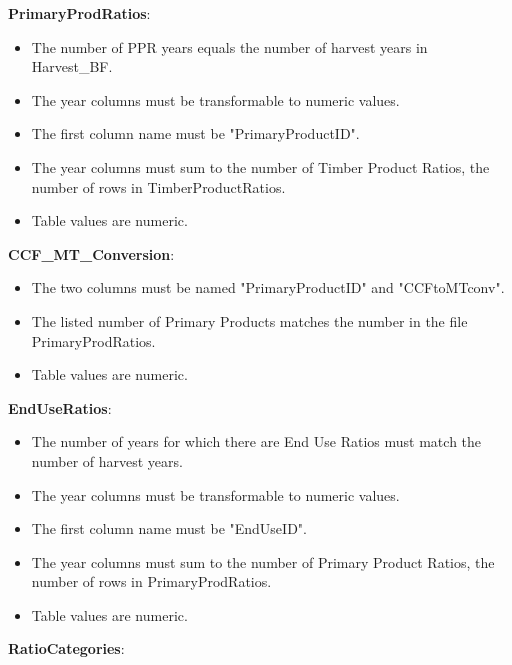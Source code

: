 \documentclass[
  openany]{book}
\providecommand{\tightlist}{%
  \setlength{\itemsep}{0pt}\setlength{\parskip}{0pt}}
\begin{document}
\textbf{PrimaryProdRatios}:

\begin{itemize}
\tightlist
\item
  The number of PPR years equals the number of harvest years in Harvest\_BF.\\
\item
  The year columns must be transformable to numeric values.\\
\item
  The first column name must be "PrimaryProductID".\\
\item
  The year columns must sum to the number of Timber Product Ratios, the number of rows in TimberProductRatios.\\
\item
  Table values are numeric.
\end{itemize}

\textbf{CCF\_MT\_Conversion}:

\begin{itemize}
\tightlist
\item
  The two columns must be named "PrimaryProductID" and "CCFtoMTconv".\\
\item
  The listed number of Primary Products matches the number in the file PrimaryProdRatios.\\
\item
  Table values are numeric.
\end{itemize}

\textbf{EndUseRatios}:

\begin{itemize}
\tightlist
\item
  The number of years for which there are End Use Ratios must match the number of harvest years.\\
\item
  The year columns must be transformable to numeric values.\\
\item
  The first column name must be "EndUseID".\\
\item
  The year columns must sum to the number of Primary Product Ratios, the number of rows in PrimaryProdRatios.\\
\item
  Table values are numeric.
\end{itemize}

\textbf{RatioCategories}:
\end{document}
